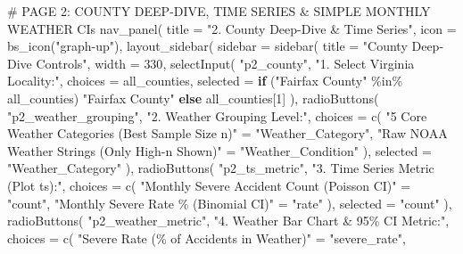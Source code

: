 \documentclass[
  letterpaper,
  DIV=11,
  numbers=noendperiod]{scrartcl}
\newenvironment{Shaded}{\begin{snugshade}}{\end{snugshade}}
\newcommand{\AttributeTok}[1]{\textcolor[rgb]{0.40,0.45,0.13}{#1}}
\newcommand{\CommentTok}[1]{\textcolor[rgb]{0.37,0.37,0.37}{#1}}
\newcommand{\ControlFlowTok}[1]{\textcolor[rgb]{0.00,0.23,0.31}{\textbf{#1}}}
\newcommand{\DecValTok}[1]{\textcolor[rgb]{0.68,0.00,0.00}{#1}}
\newcommand{\FunctionTok}[1]{\textcolor[rgb]{0.28,0.35,0.67}{#1}}
\newcommand{\NormalTok}[1]{\textcolor[rgb]{0.00,0.23,0.31}{#1}}
\newcommand{\OtherTok}[1]{\textcolor[rgb]{0.00,0.23,0.31}{#1}}
\newcommand{\SpecialCharTok}[1]{\textcolor[rgb]{0.37,0.37,0.37}{#1}}
\newcommand{\StringTok}[1]{\textcolor[rgb]{0.13,0.47,0.30}{#1}}
\begin{document}
\begin{Shaded}
\begin{Highlighting}[]
  \CommentTok{\# PAGE 2: COUNTY DEEP{-}DIVE, TIME SERIES \& SIMPLE MONTHLY WEATHER CIs}
  \FunctionTok{nav\_panel}\NormalTok{(}
    \AttributeTok{title =} \StringTok{"2. County Deep{-}Dive \& Time Series"}\NormalTok{,}
    \AttributeTok{icon =} \FunctionTok{bs\_icon}\NormalTok{(}\StringTok{"graph{-}up"}\NormalTok{),}
    \FunctionTok{layout\_sidebar}\NormalTok{(}
      \AttributeTok{sidebar =} \FunctionTok{sidebar}\NormalTok{(}
        \AttributeTok{title =} \StringTok{"County Deep{-}Dive Controls"}\NormalTok{,}
        \AttributeTok{width =} \DecValTok{330}\NormalTok{,}
        \FunctionTok{selectInput}\NormalTok{(}
          \StringTok{"p2\_county"}\NormalTok{,}
          \StringTok{"1. Select Virginia Locality:"}\NormalTok{,}
          \AttributeTok{choices =}\NormalTok{ all\_counties,}
          \AttributeTok{selected =} \ControlFlowTok{if}\NormalTok{ (}\StringTok{"Fairfax County"} \SpecialCharTok{\%in\%}\NormalTok{ all\_counties) }\StringTok{"Fairfax County"} \ControlFlowTok{else}\NormalTok{ all\_counties[}\DecValTok{1}\NormalTok{]}
\NormalTok{        ),}
        \FunctionTok{radioButtons}\NormalTok{(}
          \StringTok{"p2\_weather\_grouping"}\NormalTok{,}
          \StringTok{"2. Weather Grouping Level:"}\NormalTok{,}
          \AttributeTok{choices =} \FunctionTok{c}\NormalTok{(}
            \StringTok{"5 Core Weather Categories (Best Sample Size n)"} \OtherTok{=} \StringTok{"Weather\_Category"}\NormalTok{,}
            \StringTok{"Raw NOAA Weather Strings (Only High{-}n Shown)"}   \OtherTok{=} \StringTok{"Weather\_Condition"}
\NormalTok{          ),}
          \AttributeTok{selected =} \StringTok{"Weather\_Category"}
\NormalTok{        ),}
        \FunctionTok{radioButtons}\NormalTok{(}
          \StringTok{"p2\_ts\_metric"}\NormalTok{,}
          \StringTok{"3. Time Series Metric (Plot ts):"}\NormalTok{,}
          \AttributeTok{choices =} \FunctionTok{c}\NormalTok{(}
            \StringTok{"Monthly Severe Accident Count (Poisson CI)"} \OtherTok{=} \StringTok{"count"}\NormalTok{,}
            \StringTok{"Monthly Severe Rate \% (Binomial CI)"}        \OtherTok{=} \StringTok{"rate"}
\NormalTok{          ),}
          \AttributeTok{selected =} \StringTok{"count"}
\NormalTok{        ),}
        \FunctionTok{radioButtons}\NormalTok{(}
          \StringTok{"p2\_weather\_metric"}\NormalTok{,}
          \StringTok{"4. Weather Bar Chart \& 95\% CI Metric:"}\NormalTok{,}
          \AttributeTok{choices =} \FunctionTok{c}\NormalTok{(}
            \StringTok{"Severe Rate (\% of Accidents in Weather)"}  \OtherTok{=} \StringTok{"severe\_rate"}\NormalTok{,}

\end{Highlighting}
\end{Shaded}
\end{document}
